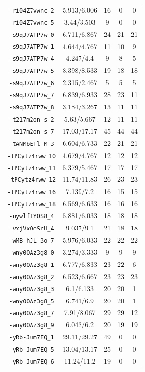 \documentclass[bwprint]{gmcmthesis}
\begin{document}
\begin{longtable}{@{\extracolsep{\fill}}ccccc@{}}
\texttt{-ri04Z7vwnc\_2} & 5.913/6.006 & 16 & 0 & 0 \\
\texttt{-ri04Z7vwnc\_5} & 3.44/3.503 & 9 & 0 & 0 \\
\texttt{-s9qJ7ATP7w\_0} & 6.711/6.867 & 24 & 21 & 21 \\
\texttt{-s9qJ7ATP7w\_1} & 4.644/4.767 & 11 & 10 & 9 \\
\texttt{-s9qJ7ATP7w\_4} & 4.247/4.4 & 9 & 8 & 5 \\
\texttt{-s9qJ7ATP7w\_5} & 8.398/8.533 & 19 & 18 & 18 \\
\texttt{-s9qJ7ATP7w\_6} & 2.315/2.467 & 5 & 5 & 5 \\
\texttt{-s9qJ7ATP7w\_7} & 6.839/6.933 & 28 & 23 & 11 \\
\texttt{-s9qJ7ATP7w\_8} & 3.184/3.267 & 13 & 11 & 11 \\
\texttt{-t217m2on-s\_2} & 5.63/5.667 & 12 & 11 & 11 \\
\texttt{-t217m2on-s\_7} & 17.03/17.17 & 45 & 44 & 44 \\
\texttt{-tANM6ETl\_M\_3} & 6.604/6.733 & 22 & 21 & 21 \\
\texttt{-tPCytz4rww\_10} & 4.679/4.767 & 12 & 12 & 12 \\
\texttt{-tPCytz4rww\_11} & 5.379/5.467 & 17 & 17 & 17 \\
\texttt{-tPCytz4rww\_12} & 11.74/11.83 & 26 & 23 & 23 \\
\texttt{-tPCytz4rww\_16} & 7.139/7.2 & 16 & 15 & 15 \\
\texttt{-tPCytz4rww\_18} & 6.569/6.633 & 16 & 16 & 16 \\
\texttt{-uywlfIYOS8\_4} & 5.881/6.033 & 18 & 18 & 18 \\
\texttt{-vxjVxOeScU\_4} & 9.037/9.1 & 21 & 18 & 18 \\
\texttt{-wMB\_hJL-3o\_7} & 5.976/6.033 & 22 & 22 & 22 \\
\texttt{-wny0OAz3g8\_0} & 3.274/3.333 & 9 & 9 & 9 \\
\texttt{-wny0OAz3g8\_1} & 6.777/6.833 & 23 & 22 & 6 \\
\texttt{-wny0OAz3g8\_2} & 6.523/6.667 & 23 & 23 & 23 \\
\texttt{-wny0OAz3g8\_3} & 6.1/6.133 & 20 & 20 & 1 \\
\texttt{-wny0OAz3g8\_5} & 6.741/6.9 & 20 & 20 & 1 \\
\texttt{-wny0OAz3g8\_7} & 7.91/8.067 & 29 & 29 & 12 \\
\texttt{-wny0OAz3g8\_9} & 6.043/6.2 & 20 & 19 & 19 \\
\texttt{-yRb-Jum7EQ\_1} & 29.11/29.27 & 49 & 0 & 0 \\
\texttt{-yRb-Jum7EQ\_5} & 13.04/13.17 & 25 & 0 & 0 \\
\texttt{-yRb-Jum7EQ\_6} & 11.24/11.2 & 19 & 0 & 0 \\
\end{longtable}
\endgroup
\end{document}
